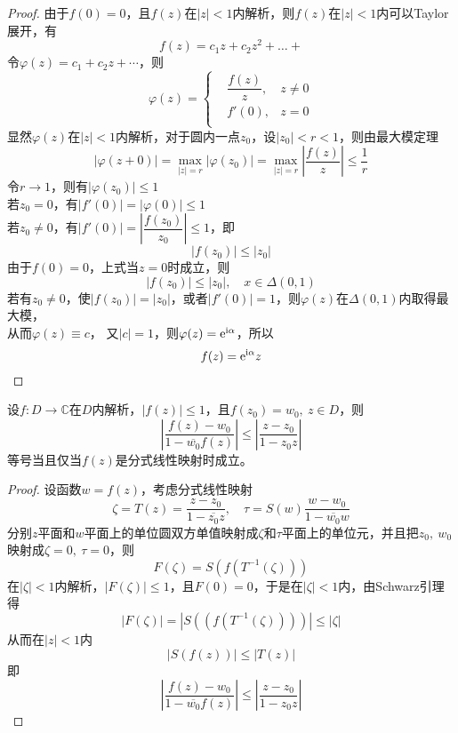 \begin{proof}
    
        
    由于$f(0) = 0$，且$f(z)$在$|z| < 1$内解析，则$f(z)$在$|z|<1$内可以\textup{Taylor}展开，有
    $$f(z) = c_1 z + c_2 z^2 + \dots + $$
    令$\varphi(z) =  c_1 + c_2 z + \cdots $，则
    $$
    \varphi(z) = 
    \left\{
        \begin{aligned}
            &\dfrac{f(z)}{z}, & z \neq 0\\
            &f'(0), & z = 0\\
        \end{aligned}
    \right.
    $$
    显然$\varphi(z)$在$|z| < 1$内解析，对于圆内一点$z_0$，设$|z_0| < r < 1$，则由最大模定理
    $$|\varphi(z+0)| = \max_{|z| = r}|\varphi(z_0)| = \max_{|z| = r}{\left| \dfrac{f(z)}{z}\right|} \leq \dfrac{1}{r}$$
    令$r \to 1$，则有$|\varphi(z_0)| \leq 1$\\
    若$z_0 = 0$，有$|f'(0)| = |\varphi(0)| \leq 1$\\
    若$z_0 \neq 0$，有$|f'(0)| = \left| \dfrac{f(z_0)}{z_0} \right| \leq 1$，即
    $$|f(z_0)| \leq |z_0|$$
    由于$f(0) = 0$，上式当$z=0$时成立，则
    $$|f(z_0)| \leq |z_0|,\quad x\in \Delta(0,1)$$
    若有$z_0 \neq 0$，使$|f(z_0)| = |z_0| $，或者$|f'(0)| = 1$，则$\varphi(z)$在$\Delta(0,1)$内取得最大模，\\
    从而$\varphi(z) \equiv c$， 又$|c| = 1$，则$\varphi(z) = \mathrm{e}^{\mathrm{i}\alpha}$，所以
    $$f(z) = \mathrm{e}^{\mathrm{i}\alpha}z$$

\end{proof}

\begin{theorem}

    设$f:D\to\mathbb{C}$在$D$内解析，$|f(z)| \leq 1$，且$f(z_0) = w_0,\ z\in D$，则
    $$ \left| \dfrac{f(z)-w_0}{1-\overline{w_0}f(z)}\right| \leq \left| \dfrac{z-z_0}{1 - z_0z}\right|$$
    等号当且仅当$f(z)$是分式线性映射时成立。

\end{theorem}

\begin{proof}
    
    设函数$w =f(z)$，考虑分式线性映射
    $$\zeta = T(z) = \dfrac{z - z_0}{1 - \overline{z_0}z},\quad \tau = S(w) \dfrac{w - w_0}{1 - \overline{w_0}w}$$
    分别$z$平面和$w$平面上的单位圆双方单值映射成$\zeta$和$\tau$平面上的单位元，并且把$z_0,\ w_0$映射成$\zeta = 0,\ \tau = 0$，则
    $$F(\zeta) = S(f(T^{-1}(\zeta)))$$
    在$|\zeta| < 1$内解析，$|F(\zeta)| \leq 1$，且$F(0) = 0$，于是在$|\zeta| < 1$内，由\textup{Schwarz}引理得
    $$|F(\zeta)| = |S((f(T^{-1}(\zeta))))| \leq |\zeta|$$
    从而在$|z|<1$内
    $$|S(f(z))| \leq |T(z)|$$
    即
    $$ \left| \dfrac{f(z)-w_0}{1-\overline{w_0}f(z)}\right| \leq \left| \dfrac{z-z_0}{1 - z_0z}\right|$$
    
\end{proof}